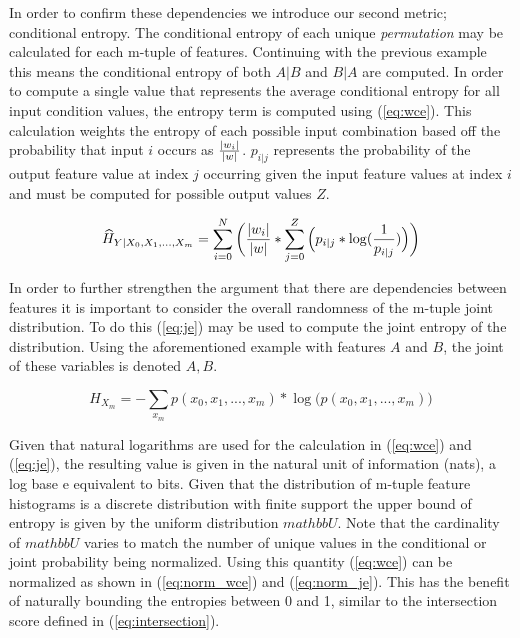 In order to confirm these dependencies we introduce our second metric; conditional entropy. The conditional entropy of each unique \emph{permutation} may be calculated for each m-tuple of features. Continuing with the previous example this means the conditional entropy of both $A|B$ and $B|A$ are computed. In order to compute a single value that represents the average conditional entropy for all input condition values, the entropy term is computed using (\ref{eq:wce}). This calculation weights the entropy of each possible input combination based off the probability that input $i$ occurs as ${{|w_i|} \over {|w|}}$. ${p_{i|j}}$ represents the probability of the output feature value at index $j$ occurring given the input feature values at index $i$ and must be computed for possible output values $Z$.

\begin{equation}
\label{eq:wce}
\widehat{H}_{Y|X_0, X_1, ..., X_m} = \sum_{i=0}^{N} \bigg({{|w_i|} \over {|w|}} * {\sum_{j=0}^{Z}\Big({p_{i|j} * \log ({1 \over{p_{i|j}}})}\Big)}\bigg)
\end{equation}

In order to further strengthen the argument that there are dependencies between features it is important to consider the overall randomness of the m-tuple joint distribution. To do this (\ref{eq:je}) may be used to compute the joint entropy of the distribution. Using the aforementioned example with features $A$ and $B$, the joint of these variables is denoted $A,B$.

\begin{equation}
\label{eq:je}
{H}_{X_m} = -\sum_{x_m} p(x_0, x_1,...,x_m)  * \log \big({{p(x_0,x_1,...,x_m)}}\big)
\end{equation}

Given that natural logarithms are used for the calculation in (\ref{eq:wce}) and (\ref{eq:je}), the resulting value is given in the natural unit of information (nats), a log base e equivalent to bits. Given that the distribution of m-tuple feature histograms is a discrete distribution with finite support the upper bound of entropy is given by the uniform distribution $mathbb{U}$. Note that the cardinality of $mathbb{U}$ varies to match the number of unique values in the conditional or joint probability being normalized. Using this quantity (\ref{eq:wce}) can be normalized as shown in (\ref{eq:norm_wce}) and (\ref{eq:norm_je}). This has the benefit of naturally bounding the entropies between 0 and 1, similar to the intersection score defined in (\ref{eq:intersection}).


